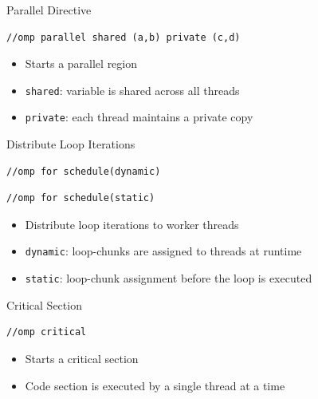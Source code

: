 \begin{frame}[fragile]{Parallel Directive}
\begin{lstlisting}
//omp parallel shared (a,b) private (c,d)
\end{lstlisting}


  \begin{itemize}
  \item Starts a parallel region
  \item \verb!shared!: variable is shared across all threads
  \item \verb!private!: each thread maintains a private copy
  \end{itemize}
\end{frame}

\begin{frame}[fragile]{Distribute Loop Iterations}
\begin{lstlisting}
//omp for schedule(dynamic)
\end{lstlisting}

\begin{lstlisting}
//omp for schedule(static)
\end{lstlisting}


  \begin{itemize}
  \item Distribute loop iterations to worker threads
  \item \verb!dynamic!: loop-chunks are assigned to threads at runtime
  \item \verb!static!: loop-chunk assignment before the loop is
    executed
  \end{itemize}
\end{frame}

\begin{frame}[fragile]{Critical Section}
\begin{lstlisting}
//omp critical
\end{lstlisting}


  \begin{itemize}
  \item Starts a critical section
  \item Code section is executed by a single thread at a time
  \end{itemize}
\end{frame}


